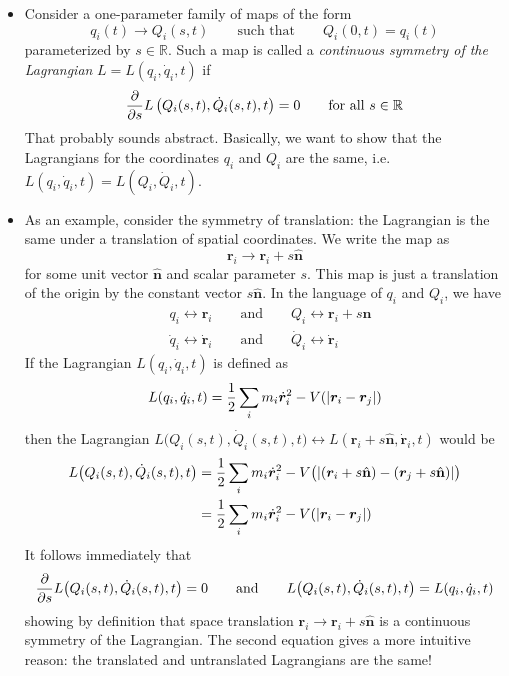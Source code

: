 \documentclass[11pt, a4paper]{article}
\newcommand{\eqtext}[1]{\qquad \text{#1} \qquad}
\newcommand{\R}{\mathbb{R}} %
\newcommand{\uvec}[1]{\hat{\mathbf{#1}}}
\newcommand{\bdot}[1]{\dot{\bm{#1}}}
\begin{document}
\begin{itemize}
	\item Consider a one-parameter family of maps of the form
	\begin{equation*}
		q_i(t) \to Q_i(s, t) \eqtext{such that} Q_i(0, t) = q_i(t)
	\end{equation*}
	parameterized by $ s \in \R $.	Such a map is called a \textit{continuous symmetry of the Lagrangian} $ L = L(q_i, \dot{q}_i, t) $ if 
	\begin{equation*}
		\pdv{}{s} L\left (Q_i(s, t), \dot{Q}_i(s, t), t\right ) = 0 \qquad \text{for all } s \in \R
	\end{equation*}
	That probably sounds abstract. Basically, we want to show that the Lagrangians for the coordinates $ q_{i} $ and $ Q_{i} $ are the same, i.e. $ L(q_i, \dot{q}_i, t) = L(Q_i, \dot{Q}_i, t) $. 
	
	\item As an example, consider the symmetry of translation: the Lagrangian is the same under a translation of spatial coordinates. We write the map as 
	\begin{equation*}
		\bm{r}_{i} \to \bm{r}_{i} + s \uvec{n}
	\end{equation*}
	for some unit vector $ \uvec{n} $ and scalar parameter $ s $. This map is just a translation of the origin by the constant vector $ s \uvec{n} $. In the language of $ q_{i} $ and $ Q_{i} $, we have
	\begin{align*}
		&q_{i} \leftrightarrow \bm{r}_{i} \eqtext{and} Q_{i} \leftrightarrow \bm{r}_{i} + s\uvec{n}\\
		&\dot{q}_{i} \leftrightarrow \bdot{r}_{i} \eqtext{and} \dot{Q}_{i} \leftrightarrow \bdot{r}_{i}
	\end{align*}
	If the Lagrangian $ L(q_{i}, \dot{q}_{i}, t) $ is defined as
	\begin{equation*}
		L(q_{i}, \dot{q}_{i}, t) = \frac{1}{2}\sum_{i}m_{i} \bdot{r}_{i}^{2} - V(\abs{\bm{r}_{i} - \bm{r}_{j}})
	\end{equation*}
	then the Lagrangian $ L\big (Q_i(s, t), \dot{Q}_i(s, t), t\big ) \leftrightarrow L(\bm{r}_{i} + s\uvec{n}, \bdot{r}_{i}, t) $ would be
	\begin{align*}
	L\big (Q_i(s, t), \dot{Q}_i(s, t), t\big ) &=\frac{1}{2}\sum_{i}m_{i} \bdot{r}_{i}^{2} - V\big(\abs{(\bm{r}_{i} + s\uvec{n}) - (\bm{r}_{j} + s\uvec{n})}\big ) \\
	&=\frac{1}{2}\sum_{i}m_{i} \bdot{r}_{i}^{2} - V(\abs{\bm{r}_{i} - \bm{r}_{j}})
	\end{align*}
	It follows immediately that 
	\begin{equation*}
	\pdv{}{s}L\big (Q_i(s, t), \dot{Q}_i(s, t), t\big ) = 0 \eqtext{and}  L\big (Q_i(s, t), \dot{Q}_i(s, t), t\big ) = L(q_{i}, \dot{q}_{i}, t)
	\end{equation*}
	showing by definition that space translation $ \bm{r}_{i} \to \bm{r}_{i} + s \uvec{n} $ is a continuous symmetry of the Lagrangian. The second equation gives a more intuitive reason: the translated and untranslated Lagrangians are the same!

\end{itemize}
\end{document}
